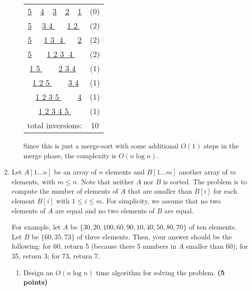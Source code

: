 \documentclass[11pt]{article}
\begin{document}
\begin{enumerate}
\begin{enumerate}
    \begin{center}
    \begin{tabular}{cccccc}
      \underline{5} & \underline{4} & \underline{3} & \underline{2} & \underline{1} & (0) \\
      \underline{5} & \multicolumn{2}{c}{\underline{3 \textcircled{4}}} & \multicolumn{2}{c}{\underline{1 \textcircled{2}}} & (2) \\
      \underline{5} & \multicolumn{3}{c}{\underline{1 \textcircled{3} \textcircled{4}}} & \underline{2} & (2) \\
      \underline{5} & \multicolumn{4}{c}{\underline{1 2 \textcircled{3} \textcircled{4}}} & (2) \\
      \multicolumn{2}{c}{\underline{1 \textcircled{5}}} & \multicolumn{3}{c}{\underline{2 3 4}} & (1) \\
      \multicolumn{3}{c}{\underline{1 2 \textcircled{5}}} & \multicolumn{2}{c}{\underline{3 4}} & (1) \\
      \multicolumn{4}{c}{\underline{1 2 3 \textcircled{5}}} & \underline{4} & (1) \\
      \multicolumn{5}{c}{\underline{1 2 3 4 \textcircled{5}}} & (1) \\
      \hline
      \multicolumn{5}{c}{total inversions:} & 10
    \end{tabular}
    \end{center}
    Since this is just a merge-sort with some additional $O(1)$ steps in the merge phase, the complexity is $O(n\log n)$.

\end{enumerate}


\item

Let $A[1\ldots n]$ be an array of $n$ elements and $B[1\ldots m]$ another array of $m$ elements, with $m\leq n$. Note that neither $A$ nor $B$ is sorted. The problem is to compute the number of elements of $A$ that are smaller than $B[i]$ for each element $B[i]$ with $1\leq i\leq m$.
For simplicity, we assume that no two elements of $A$ are equal and no two elements of $B$ are equal.

For example, let $A$ be $\{30, 20, 100, 60, 90, 10, 40, 50, 80, 70\}$ of ten elements. Let $B$ be $\{60, 35, 73\}$ of three elements. Then, your answer should be the following: for 60, return 5 (because there 5 numbers in $A$ smaller than 60); for 35, return 3; for 73, return 7.

\begin{enumerate}
\item
Design an $O(n\log n)$ time algorithm for solving the problem. {\hfill \bf (5 points)}


\end{enumerate}
\end{enumerate}
\end{document}
